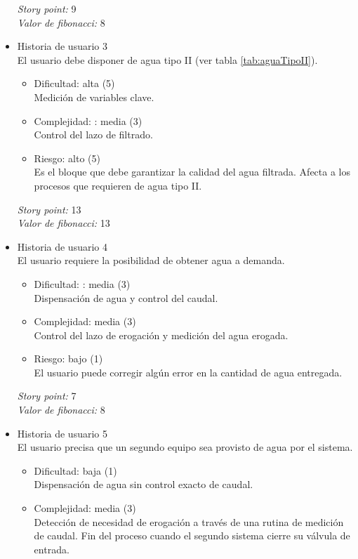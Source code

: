 \documentclass[
11pt, %
]{charter}
\begin{document}
\begin{itemize}
\begin{itemize}
	\end{itemize}
\textit{Story point:} 9\\
\textit{Valor de fibonacci:} 8
\item  Historia de usuario 3
\\El usuario debe disponer de agua tipo II (ver tabla \ref{tab:aguaTipoII}).
	\begin{itemize}
		\item Dificultad: alta (5)
		\\Medición de variables clave. 
		\item Complejidad: : media (3)
		\\Control del lazo de filtrado.
		\item Riesgo: alto (5)
		\\Es el bloque que debe garantizar la calidad del agua filtrada. Afecta a los procesos que requieren de agua tipo II.
	\end{itemize}
\textit{Story point:} 13\\
\textit{Valor de fibonacci:} 13
\item  Historia de usuario 4
\\El usuario requiere la posibilidad de obtener agua a demanda.
	\begin{itemize}
		\item Dificultad: : media (3)
		\\Dispensación de agua y control del caudal.
		\item Complejidad: media (3)
		\\Control del lazo de erogación y medición del agua erogada.
		\item Riesgo: bajo (1)
		\\El usuario puede corregir algún error en la cantidad de agua entregada.
	\end{itemize}
\textit{Story point:} 7\\
\textit{Valor de fibonacci:} 8
\item  Historia de usuario 5
\\El usuario precisa que un segundo equipo sea provisto de agua por el sistema.
	\begin{itemize}
		\item Dificultad: baja (1)
		\\Dispensación de agua sin control exacto de caudal.
		\item Complejidad: media (3)
		\\Detección de necesidad de erogación a través de una rutina de medición de caudal. Fin del proceso cuando el segundo sistema cierre su válvula de entrada.

\end{itemize}
\end{itemize}
\end{document}
